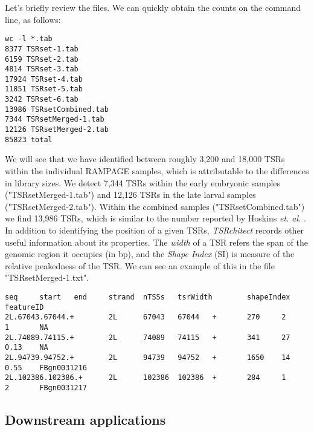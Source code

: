 \documentclass[runningheads,a4paper]{llncs}
\begin{document}
\begin{linenumbers}
\begin{itemize}
Let's briefly review the files. 
We can quickly obtain the counts on the command line, as follows:

\noindent
\begin{verbatim}
wc -l *.tab
8377 TSRset-1.tab
6159 TSRset-2.tab
4814 TSRset-3.tab
17924 TSRset-4.tab
11851 TSRset-5.tab
3242 TSRset-6.tab
13986 TSRsetCombined.tab
7344 TSRsetMerged-1.tab
12126 TSRsetMerged-2.tab
85823 total
\end{verbatim}

We will see that we have identified between roughly 3,200 and 18,000 TSRs within the individual RAMPAGE samples, which is attributable to the differences in library sizes. 
We detect 7,344 TSRs within the early embryonic samples ("TSRsetMerged-1.tab") and 12,126 TSRs in the late larval samples ("TSRsetMerged-2.tab").
Within the combined samples ("TSRsetCombined.tab") we find 13,986 TSRs, which is similar to the number reported by Hoskins \textit{et. al.} \cite{Hoskins:2011io}.\\

In addition to identifying the position of a given TSRs, \textit{TSRchitect} records other useful information about its properties.
The \textit{width} of a TSR refers the span of the genomic region it occupies (in bp), and the \textit{Shape Index} (SI) is measure of the relative peakedness of the TSR.
We can see an example of this in the file "TSRsetMerged-1.txt".

\noindent
\begin{verbatim}
seq     start   end     strand  nTSSs   tsrWidth        shapeIndex      featureID
2L.67043.67044.+        2L      67043   67044   +       270     2       1       NA
2L.74089.74115.+        2L      74089   74115   +       341     27      0.13    NA
2L.94739.94752.+        2L      94739   94752   +       1650    14      0.55    FBgn0031216
2L.102386.102386.+      2L      102386  102386  +       284     1       2       FBgn0031217
\end{verbatim}

\subsection{Downstream applications}


\end{itemize}
\end{linenumbers}
\end{document}
